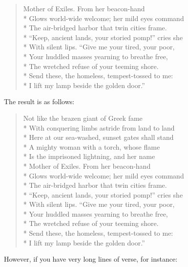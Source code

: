 \begin{Example}
\begin{lstcode}
\begin{verse}
    Mother of Exiles. From her beacon-hand\\*
    Glows world-wide welcome; her mild eyes command\\*
    The air-bridged harbor that twin cities frame.\\*
    ``Keep, ancient lands, your storied pomp!'' cries she\\*
    With silent lips. ``Give me your tired, your poor,\\*
    Your huddled masses yearning to breathe free,\\*
    The wretched refuse of your teeming shore.\\*
    Send these, the homeless, tempest-tossed to me:\\*
    I lift my lamp beside the golden door.''
  \end{verse}
\end{lstcode}
      The result is as follows:
      \begin{ShowOutput}
        \begin{verse}
          Not like the brazen giant of Greek fame\\*
          With conquering limbs astride from land to land\\*
          Here at our sea-washed, sunset gates shall stand\\*
          A mighty woman with a torch, whose flame\\*
          Is the imprisoned lightning, and her name\\*
          Mother of Exiles. From her beacon-hand\\*
          Glows world-wide welcome; her mild eyes command\\*
          The air-bridged harbor that twin cities frame.\\*
          ``Keep, ancient lands, your storied pomp!'' cries she\\*
          With silent lips. ``Give me your tired, your poor,\\*
          Your huddled masses yearning to breathe free,\\*
          The wretched refuse of your teeming shore.\\*
          Send these, the homeless, tempest-tossed to me:\\*
          I lift my lamp beside the golden door.''
        \end{verse}
      \end{ShowOutput}
\fi
      However, if you have very long lines of verse, for instance:
\begin{lstcode}

\end{lstcode}
\end{Example}
